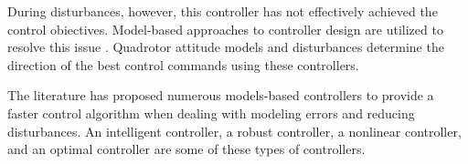 \documentclass[3p,times]{elsarticle}
\begin{document}
During disturbances, however, this controller has not effectively achieved the control obiectives.
Model-based approaches to controller design are utilized to resolve this issue \cite{bouzid:hal-02543214,9275226}.
Quadrotor attitude models and disturbances determine the direction of the best control commands using these controllers.




The literature has proposed numerous models-based controllers to provide a faster control algorithm when dealing with modeling errors and reducing disturbances.
An intelligent controller, a robust controller, a nonlinear controller, and an optimal controller are some of these types of controllers.
\end{document}
